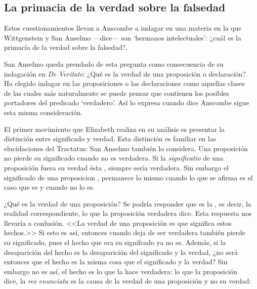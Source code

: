 \subsection{La primacia de la verdad sobre la falsedad}
Estos cuestionamientos llevan a Anscombe a indagar en una materia en la que
Wittgenstein y San Anselmo ---dice--- son `hermanos intelectuales': ¿cuál es la
primacía de la verdad sobre la falsedad?.

San Anselmo queda prendado de esta pregunta como consecuencia de su indagación
en \emph{De Veritate}: ¿Qué es la verdad de una proposición o declaración? Ha
elegido indagar en las proposiciones o las declaraciones como aquellas clases de
las cuales más naturalmente se puede pensar que contienen los posibles
portadores del predicado `verdadero'. Así lo expresa cuando dice
\autocite{De Veritate c.
  2} Anscombe sigue esta misma consideración.

El primer movimiento que Elizabeth realiza en su análisis es presentar la
distinción entre significado y verdad.
Esta distinción es familiar en las elucidaciones del Tractatus:
 \autocite[\S~4.061]{wittgenstein1922tractatus} San Anselmo también lo
considera. Una proposición no pierde su significado cuando no es verdadera. Si
la \emph{significatio} de una proposición fuera su verdad ésta
, siempre sería verdadera. Sin embargo el
significado de una proposicion , permanece lo mismo cuando lo que se afirma es el
caso que es y cuando no lo es.

¿Qué es la verdad de una proposición? Se podría responder que es la
, es decir, la realidad correspondiente, lo que
la proposición verdadera dice. Esta respuesta nos llevaría a confusión. <<La
verdad de una proposición es que significa estos hechos.>> Si esto es así,
entonces cuando deja de ser verdadera también pierde su significado, pues el
hecho que era su signifcado ya no es. Además, si la desaparición del hecho es la
desaparición del significado y la verdad, ¿no será entonces que el hecho es la
misma cosa que el significado y la verdad? Sin embargo no es así, el hecho es lo
que la hace verdadera: lo que la proposición dice, la \emph{res enunciata} es la
causa de la verdad de una proposición y no su verdad: 

